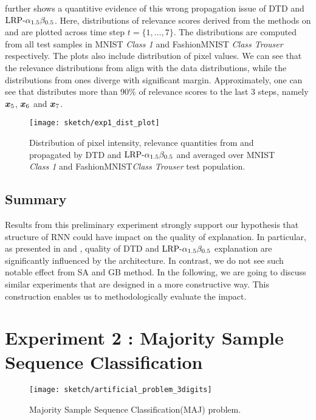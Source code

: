 \addfigure{\ref{fig:exp1_dist_plot}} further shows a quantitive evidence of this wrong propagation issue of DTD and $\text{LRP-}\alpha_{1.5}\beta_{0.5}$. Here, distributions of relevance scores derived from the methods on  and  are plotted across time step $t = \{ 1, \dots, 7 \}$. The distributions are computed from all test samples in MNIST \textit{Class 1} and FashionMNIST \textit{Class Trouser} respectively. The plots also include distribution of pixel  values.  We can see that the relevance distributions from  align with the data distributions, while  the distributions from  ones diverge with significant margin. Approximately,  one can see that  distributes more than 90\% of relevance scores to the last 3 steps, namely $\boldsymbol{x}_5$, $\boldsymbol{x}_6$ and $\boldsymbol{x}_7$.


 \begin{figure}[!htb]
\centering
\texttt{[image: sketch/exp1\_dist\_plot]}
\caption{Distribution of pixel intensity, relevance quantities from  and  propagated by DTD and $\text{LRP-}\alpha_{1.5}\beta_{0.5}$ and averaged over MNIST \textit{Class 1} and FashionMNIST\textit{Class Trouser} test population.} 
\label{fig:exp1_dist_plot}
\end{figure}

\subsection{Summary}
Results from this preliminary experiment strongly support our hypothesis that  structure of RNN could have impact on the quality of  explanation.  In particular,  as presented in \addfigure{\ref{fig:class_1_comparison}} and \addfigure{\ref{fig:exp1_dist_plot}}, quality of DTD and $\text{LRP-}\alpha_{1.5}\beta_{0.5}$ explanation are significantly influenced by the architecture. In contrast, we do not see such notable effect from SA and GB method.  In the following, we are going to discuss similar experiments that are designed in a more constructive way. This construction enables us to methodologically evaluate the impact.


\section{Experiment 2 : Majority Sample Sequence Classification} \label{sec:exp2}
   
 \begin{figure}[!htb]
\centering
\texttt{[image: sketch/artificial\_problem\_3digits]}
\caption{Majority Sample Sequence Classification(MAJ) problem.} 
\label{fig:artificial_problem_3digits}
\end{figure}

